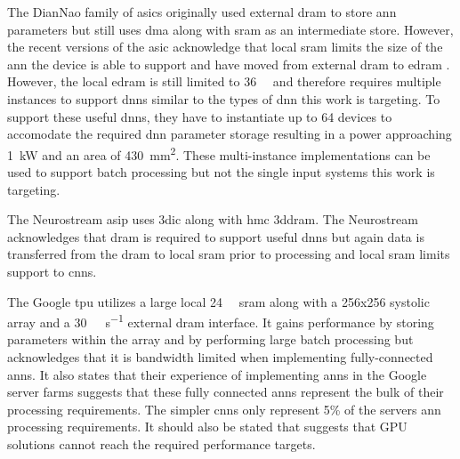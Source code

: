 {{{The DianNao family of \acp{asic} \cite{chen2014diannao} \cite{chen2016diannao} originally used external \ac{dram} to store \ac{ann} parameters but still uses \ac{dma} along with \ac{sram} as an intermediate store.
However, the recent versions of the \ac{asic} acknowledge that local \ac{sram} limits the size of the \ac{ann} the device is able to support and have moved from external \ac{dram} to \ac{edram} \cite{dadiannao2017}.
However, the local \ac{edram} is still limited to \SI[per-mode=symbol]{36}{\mega \byte} and therefore requires multiple instances to support \acp{dnn} similar to the types of \ac{dnn} this work is targeting.
To support these useful \acp{dnn}, they have to instantiate up to 64 devices to accomodate the required \ac{dnn} parameter storage resulting in a power approaching \SI[per-mode=symbol]{1}{\kilo\watt} and an area of \SI[per-mode=symbol]{430}{\mm\squared}.
These multi-instance implementations can be used to support batch processing \cite{dadiannao2017} but not the single input systems this work is targeting.

The Neurostream \ac{asip} uses \ac{3dic} along with \ac{hmc} \ac{3ddram}. 
The Neurostream acknowledges that \ac{dram} is required to support useful \acp{dnn} but again data is transferred from the \ac{dram} to local \ac{sram} prior to processing and local \ac{sram} limits support to \acp{cnn}.

The Google \ac{tpu} \cite{tensorflow2015-whitepaper} utilizes a large local \SI[per-mode=symbol]{24}{\mega \byte} \ac{sram} along with a 256x256 systolic array and a \SI[per-mode=symbol]{30}{\giga \byte\per\second} external \ac{dram} interface.
It gains performance by storing parameters within the array and by performing large batch processing but acknowledges that it is bandwidth limited when implementing fully-connected \acp{ann}.
It also states that their experience of implementing \acp{ann} in the Google server farms suggests that these fully connected \acp{ann} represent the bulk of their processing requirements.
The simpler \acp{cnn} only represent 5\% of the servers \ac{ann} processing requirements.
It should also be stated that \cite{tensorflow2015-whitepaper} suggests that GPU solutions cannot reach the required performance targets.

\iffalse
Unlike the current state-of-the-art, this work focuses on processing data as it read out of the \ac{dram} thus avoiding requiring excessive \ac{sram}.
in the \acp{pe} thus allowing optimum logic assignment to the processing functions.
\fi

}}}
